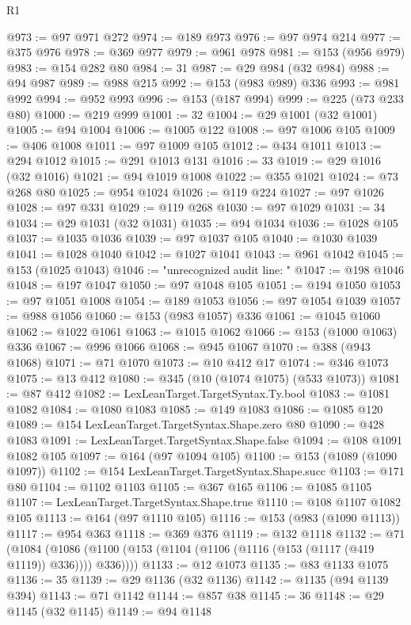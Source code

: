 \begin{lexlean}{R1}
\begin{coremodule}
{{{{{{{{{{{{{{{{{{{{{{{{{{{{{{{{{{{{{{{{{{{{{{{{{{{{{{{{{{{{{{{{{{{{{{{{{{{{{{{{{{{{{{{{{{{{{{{{{{{{{{{{{{{{{{{{{{{{{{{{{{{{{{{{{{{{{{{{{{{{{{{{{{{{{{{{{{{{{{{{{{{{{{{{{{{{{{{{{{{{{{{{{{@973 := @97 @971 @272
@974 := @189 @973
@976 := @97 @974 @214
@977 := @375 @976
@978 := @369 @977
@979 := @961 @978
@981 := @153 (@956 @979)
@983 := @154 @282 @80
@984 := 31
@987 := @29 @984 (@32 @984)
@988 := @94 @987
@989 := @988 @215
@992 := @153 (@983 @989) @336
@993 := @981 @992
@994 := @952 @993
@996 := @153 (@187 @994)
@999 := @225 (@73 @233 @80)
@1000 := @219 @999
@1001 := 32
@1004 := @29 @1001 (@32 @1001)
@1005 := @94 @1004
@1006 := @1005 @122
@1008 := @97 @1006 @105
@1009 := @406 @1008
@1011 := @97 @1009 @105
@1012 := @434 @1011
@1013 := @294 @1012
@1015 := @291 @1013 @131
@1016 := 33
@1019 := @29 @1016 (@32 @1016)
@1021 := @94 @1019 @1008
@1022 := @355 @1021
@1024 := @73 @268 @80
@1025 := @954 @1024
@1026 := @119 @224
@1027 := @97 @1026
@1028 := @97 @331
@1029 := @119 @268
@1030 := @97 @1029
@1031 := 34
@1034 := @29 @1031 (@32 @1031)
@1035 := @94 @1034
@1036 := @1028 @105
@1037 := @1035 @1036
@1039 := @97 @1037 @105
@1040 := @1030 @1039
@1041 := @1028 @1040
@1042 := @1027 @1041
@1043 := @961 @1042
@1045 := @153 (@1025 @1043)
@1046 := "unrecognized audit line: "
@1047 := @198 @1046
@1048 := @197 @1047
@1050 := @97 @1048 @105
@1051 := @194 @1050
@1053 := @97 @1051 @1008
@1054 := @189 @1053
@1056 := @97 @1054 @1039
@1057 := @988 @1056
@1060 := @153 (@983 @1057) @336
@1061 := @1045 @1060
@1062 := @1022 @1061
@1063 := @1015 @1062
@1066 := @153 (@1000 @1063) @336
@1067 := @996 @1066
@1068 := @945 @1067
@1070 := @388 (@943 @1068)
@1071 := @71 @1070
@1073 := @10 @412 @17
@1074 := @346 @1073
@1075 := @13 @412
@1080 := @345 (@10 (@1074 @1075) (@533 @1073))
@1081 := @87 @412
@1082 := LexLeanTarget.TargetSyntax.Ty.bool
@1083 := @1081 @1082
@1084 := @1080 @1083
@1085 := @149 @1083
@1086 := @1085 @120
@1089 := @154 LexLeanTarget.TargetSyntax.Shape.zero @80
@1090 := @428 @1083
@1091 := LexLeanTarget.TargetSyntax.Shape.false
@1094 := @108 @1091 @1082 @105
@1097 := @164 (@97 @1094 @105)
@1100 := @153 (@1089 (@1090 @1097))
@1102 := @154 LexLeanTarget.TargetSyntax.Shape.succ
@1103 := @171 @80
@1104 := @1102 @1103
@1105 := @367 @165
@1106 := @1085 @1105
@1107 := LexLeanTarget.TargetSyntax.Shape.true
@1110 := @108 @1107 @1082 @105
@1113 := @164 (@97 @1110 @105)
@1116 := @153 (@983 (@1090 @1113))
@1117 := @954 @363
@1118 := @369 @376
@1119 := @132 @1118
@1132 := @71
    (@1084 (@1086 (@1100 (@153 (@1104 (@1106 (@1116 (@153 (@1117 (@419 @1119)) @336)))) @336))))
@1133 := @12 @1073
@1135 := @83 @1133 @1075
@1136 := 35
@1139 := @29 @1136 (@32 @1136)
@1142 := @1135 (@94 @1139 @394)
@1143 := @71 @1142
@1144 := @857 @38
@1145 := 36
@1148 := @29 @1145 (@32 @1145)
@1149 := @94 @1148
}}}}}}}}}}}}}}}}}}}}}}}}}}}}}}}}}}}}}}}}}}}}}}}}}}}}}}}}}}}}}}}}}}}}}}}}}}}}}}}}}}}}}}}}}}}}}}}}}}}}}}}}}}}}}}}}}}}}}}}}}}}}}}}}}}}}}}}}}}}}}}}}}}}}}}}}}}}}}}}}}}}}}}}}}}}}}}}}}}}}}}}}}}
\end{coremodule}
\end{lexlean}
